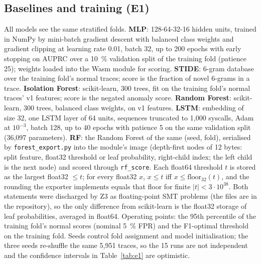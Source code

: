 \subsection{Baselines and training (E1)}
\label{sec:appendix:baselines}
All models see the same stratified folds. \textbf{\sys MLP}: 128-64-32-16
hidden units, trained in NumPy by mini-batch gradient descent with
balanced class weights and gradient clipping at learning rate 0.01, batch
32, up to 200 epochs with early stopping on AUPRC over a
\SI{10}{\percent} validation split of the training fold (patience 25);
weights loaded into the Wasm module for scoring. \textbf{STIDE}: 6-gram
database over the training fold's normal traces; score is the fraction of
novel 6-grams in a trace. \textbf{Isolation Forest}: scikit-learn, 300
trees, fit on the training fold's normal traces' v1 features; score is the
negated anomaly score. \textbf{Random Forest}: scikit-learn, 300 trees,
balanced class weights, on v1 features. \textbf{LSTM}: embedding of size
32, one LSTM layer of 64 units, sequences truncated to 1,000 syscalls,
Adam at $10^{-3}$, batch 128, up to 40 epochs with patience 5 on the same
validation split (36,097 parameters). \textbf{\sys RF}: the Random Forest
of the same (seed, fold), serialised by \texttt{forest\_export.py} into the
module's image (depth-first nodes of 12 bytes: split feature, float32
threshold or leaf probability, right-child index; the left child is the
next node) and scored through \texttt{rf\_score}. Each float64 threshold
$t$ is stored as the largest float32 $\le t$; for every float32 $x$,
$x \le t$ iff $x \le \mathrm{floor}_{32}(t)$, and the rounding the exporter
implements equals that floor for finite $|t| < 3\cdot10^{38}$. Both
statements were discharged by Z3 as floating-point SMT problems (the files
are in the repository), so the only difference from scikit-learn is the
float32 storage of leaf probabilities, averaged in float64. Operating
points: the 95th percentile of the training fold's normal scores (nominal
\SI{5}{\percent} FPR) and the F1-optimal threshold on the training fold.
Seeds control fold assignment and model initialisation; the three seeds
re-shuffle the same 5,951 traces, so the 15 runs are not independent and
the confidence intervals in Table~\ref{tab:e1} are optimistic.
